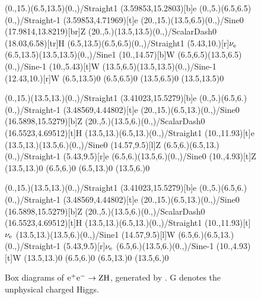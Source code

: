 \begin{figure}[H]
\begin{center}
\begin{feynartspicture}
\FADiagram{}
\FAProp(0.,15.)(6.5,13.5)(0.,){/Straight}{1}
\FALabel(3.59853,15.2803)[b]{e}
\FAProp(0.,5.)(6.5,6.5)(0.,){/Straight}{-1}
\FALabel(3.59853,4.71969)[t]{e}
\FAProp(20.,15.)(13.5,6.5)(0.,){/Sine}{0}
\FALabel(17.9814,13.8219)[br]{Z}
\FAProp(20.,5.)(13.5,13.5)(0.,){/ScalarDash}{0}
\FALabel(18.03,6.58)[tr]{H}
\FAProp(6.5,13.5)(6.5,6.5)(0.,){/Straight}{1}
\FALabel(5.43,10.)[r]{$\nu_{\rm e}$}
\FAProp(6.5,13.5)(13.5,13.5)(0.,){/Sine}{1}
\FALabel(10.,14.57)[b]{W}
\FAProp(6.5,6.5)(13.5,6.5)(0.,){/Sine}{-1}
\FALabel(10.,5.43)[t]{W}
\FAProp(13.5,6.5)(13.5,13.5)(0.,){/Sine}{-1}
\FALabel(12.43,10.)[r]{W}
\FAVert(6.5,13.5){0}
\FAVert(6.5,6.5){0}
\FAVert(13.5,6.5){0}
\FAVert(13.5,13.5){0}

\FADiagram{}
\FAProp(0.,15.)(13.5,13.)(0.,){/Straight}{1}
\FALabel(3.41023,15.5279)[b]{e}
\FAProp(0.,5.)(6.5,6.)(0.,){/Straight}{-1}
\FALabel(3.48569,4.44802)[t]{e}
\FAProp(20.,15.)(6.5,13.)(0.,){/Sine}{0}
\FALabel(16.5898,15.5279)[b]{Z}
\FAProp(20.,5.)(13.5,6.)(0.,){/ScalarDash}{0}
\FALabel(16.5523,4.69512)[t]{H}
\FAProp(13.5,13.)(6.5,13.)(0.,){/Straight}{1}
\FALabel(10.,11.93)[t]{e}
\FAProp(13.5,13.)(13.5,6.)(0.,){/Sine}{0}
\FALabel(14.57,9.5)[l]{Z}
\FAProp(6.5,6.)(6.5,13.)(0.,){/Straight}{-1}
\FALabel(5.43,9.5)[r]{e}
\FAProp(6.5,6.)(13.5,6.)(0.,){/Sine}{0}
\FALabel(10.,4.93)[t]{Z}
\FAVert(13.5,13.){0}
\FAVert(6.5,6.){0}
\FAVert(6.5,13.){0}
\FAVert(13.5,6.){0}

\FADiagram{}
\FAProp(0.,15.)(13.5,13.)(0.,){/Straight}{1}
\FALabel(3.41023,15.5279)[b]{e}
\FAProp(0.,5.)(6.5,6.)(0.,){/Straight}{-1}
\FALabel(3.48569,4.44802)[t]{e}
\FAProp(20.,15.)(6.5,13.)(0.,){/Sine}{0}
\FALabel(16.5898,15.5279)[b]{Z}
\FAProp(20.,5.)(13.5,6.)(0.,){/ScalarDash}{0}
\FALabel(16.5523,4.69512)[t]{H}
\FAProp(13.5,13.)(6.5,13.)(0.,){/Straight}{1}
\FALabel(10.,11.93)[t]{$\nu_{\rm e}$}
\FAProp(13.5,13.)(13.5,6.)(0.,){/Sine}{1}
\FALabel(14.57,9.5)[l]{W}
\FAProp(6.5,6.)(6.5,13.)(0.,){/Straight}{-1}
\FALabel(5.43,9.5)[r]{$\nu_{\rm e}$}
\FAProp(6.5,6.)(13.5,6.)(0.,){/Sine}{-1}
\FALabel(10.,4.93)[t]{W}
\FAVert(13.5,13.){0}
\FAVert(6.5,6.){0}
\FAVert(6.5,13.){0}
\FAVert(13.5,6.){0}
\end{feynartspicture}
\vspace*{-90pt}
\caption{Box diagrams of ${\rm e}^+ {\rm e}^- \rightarrow {\rm ZH}$, generated by \fa. G denotes the unphysical charged Higgs.}
\end{center}
\end{figure}

